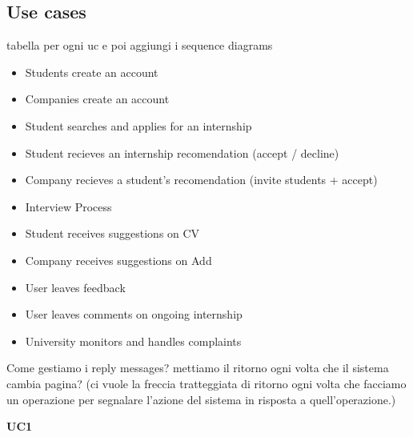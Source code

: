 \subsection{Use cases}
tabella per ogni uc e poi aggiungi i sequence diagrams
\begin{itemize}
\item Students create an account
\item Companies create an account
\item Student searches and applies for an internship
\item Student recieves an internship recomendation (accept / decline)
\item Company recieves a student’s recomendation (invite students + accept)
\item Interview Process
\item Student receives suggestions on CV
\item Company receives suggestions on Add
\item User leaves feedback
\item User leaves comments on ongoing internship
\item University monitors and handles complaints
\end{itemize}

Come gestiamo i reply messages? mettiamo il ritorno ogni volta che il sistema cambia pagina? (ci vuole la freccia tratteggiata di ritorno ogni volta che facciamo un operazione per segnalare l'azione del sistema in risposta a quell'operazione.)

\textbf{UC1}

